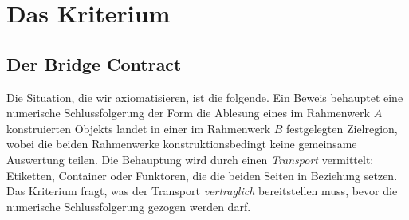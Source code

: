 \documentclass[11pt,a4paper]{article}
\begin{document}
\section{Das Kriterium}\label{sec:criterion}

\subsection{Der Bridge Contract}\label{sec:contract}

Die Situation, die wir axiomatisieren, ist die folgende. Ein Beweis behauptet
eine numerische Schlussfolgerung der Form \glqq die Ablesung eines im Rahmenwerk
$A$ konstruierten Objekts landet in einer im Rahmenwerk $B$ festgelegten
Zielregion\grqq{}, wobei die beiden Rahmenwerke konstruktionsbedingt keine
gemeinsame Auswertung teilen. Die Behauptung wird durch einen
\emph{Transport} vermittelt: Etiketten, Container oder Funktoren, die die
beiden Seiten in Beziehung setzen. Das Kriterium fragt, was der Transport
\emph{vertraglich} bereitstellen muss, bevor die numerische
Schlussfolgerung gezogen werden darf.
\end{document}
